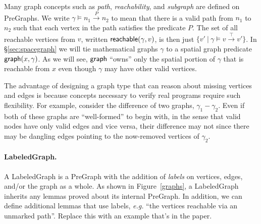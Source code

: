Many graph concepts such as \emph{path}, \emph{reachability}, and \emph{subgraph} are defined on PreGraphs.  We write $\gamma\models n_1 \xrightarrow{P} n_2$ to mean that there is a valid path from $n_1$ to $n_2$ such that each vertex in the path satisfies the predicate $P$.  The set of all reachable vertices from $v$, written $\mathsf{reachable}(\gamma,v)$, is then just $\{v' ~|~ \gamma\models v \xrightarrow{\top} v'\}$.
In \S\ref{sec:spacegraph} we will tie mathematical graphs $\gamma$ to a spatial graph predicate
$\mathsf{graph}(x, \gamma)$.   As we will see, $\mathsf{graph}$ ``owns'' only the
spatial portion of $\gamma$ that is reachable
from $x$ even though $\gamma$ may have other valid vertices.

The advantage of designing a graph type that can reason about missing vertices and edges is because concepts necessary to verify real programs require such flexibility.  For example, consider the difference of two graphs, $\gamma_1 - \gamma_2$.  Even if both of these graphs are ``well-formed'' to begin with, in the sense that valid nodes have only valid edges and vice versa, their difference may not since there may be dangling edges pointing to the now-removed vertices of $\gamma_2$.
\fi


\vspace{-0.75ex}
\iftrue
\paragraph{LabeledGraph.}
A LabeledGraph is a PreGraph with the addition of \emph{labels} on 
vertices, edges, and/or the graph as a whole. As shown in Figure~\ref{graphs}, a LabeledGraph inherits any lemmas proved about {\color{magenta}its internal PreGraph.} In addition, we can define additional lemmas that use labels, \emph{e.g.} {\color{magenta}``the vertices reachable via an unmarked path''.} {\color{blue} Replace this with an example that's in the paper.}
\fi

\iffalse
\paragraph{LabeledGraph.}
A LabeledGraph is a PreGraph with labels, e.g. the ``mark bit'' used in Figure~\ref{fig:markgraph} are labels.
\fi
\iffalse

